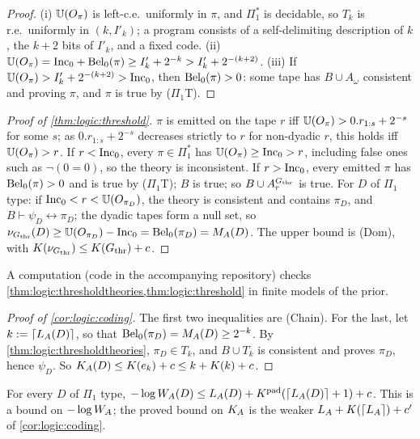 \begin{proof}
(i) $\mathbb{U}(O_\pi)$ is left-c.e.\ uniformly in $\pi$, and $\Pi_1^*$ is decidable, so $T_k$ is r.e.\ uniformly in $(k,I'_k)$; a program consists of a self-delimiting description of $k$, the $k+2$ bits of $I'_k$, and a fixed code. (ii) $\mathbb{U}(O_\pi)=\mathrm{Inc}_0+\mathrm{Bel}_0(\pi)\ge I'_k+2^{-k}>I'_k+2^{-(k+2)}$. (iii) If $\mathbb{U}(O_\pi)>I'_k+2^{-(k+2)}>\mathrm{Inc}_0$, then $\mathrm{Bel}_0(\pi)>0$: some tape has $B\cup A_\omega$ consistent and proving $\pi$, and $\pi$ is true by ($\Pi_1$T).
\end{proof}

\begin{proof}[Proof of \cref{thm:logic:threshold}]
$\pi$ is emitted on the tape $r$ iff $\mathbb{U}(O_\pi)>0.r_{1:s}+2^{-s}$ for some $s$; as $0.r_{1:s}+2^{-s}$ decreases strictly to $r$ for non-dyadic $r$, this holds iff $\mathbb{U}(O_\pi)>r$. If $r<\mathrm{Inc}_0$, every $\pi\in\Pi_1^*$ has $\mathbb{U}(O_\pi)\ge\mathrm{Inc}_0>r$, including false ones such as $\neg(0=0)$, so the theory is inconsistent. If $r>\mathrm{Inc}_0$, every emitted $\pi$ has $\mathrm{Bel}_0(\pi)>0$ and is true by ($\Pi_1$T); $B$ is true; so $B\cup A^{G_{\mathrm{thr}}}_r$ is true. For $D$ of $\Pi_1$ type: if $\mathrm{Inc}_0<r<\mathbb{U}(O_{\pi_D})$, the theory is consistent and contains $\pi_D$, and $B\vdash\psi_D\leftrightarrow\pi_D$; the dyadic tapes form a null set, so $\nu_{G_{\mathrm{thr}}}(D)\ge\mathbb{U}(O_{\pi_D})-\mathrm{Inc}_0=\mathrm{Bel}_0(\pi_D)=M_{A}(D)$. The upper bound is (Dom), with $K(\nu_{G_{\mathrm{thr}}})\le K(G_{\mathrm{thr}})+c$.
\end{proof}

A computation (code in the accompanying repository) checks \cref{thm:logic:thresholdtheories,thm:logic:threshold} in finite models of the prior.

\begin{proof}[Proof of \cref{cor:logic:coding}]
The first two inequalities are (Chain). For the last, let $k:=\lceil L_{A}(D)\rceil$, so that $\mathrm{Bel}_0(\pi_D)=M_{A}(D)\ge2^{-k}$. By \cref{thm:logic:thresholdtheories}, $\pi_D\in T_k$, and $B\cup T_k$ is consistent and proves $\pi_D$, hence $\psi_D$. So $K_{A}(D)\le K(e_k)+c\le k+K(k)+c$.
\end{proof}

\begin{remark}\label{rem:logic:Wbound}
For every $D$ of $\Pi_1$ type, $-\log W_{A}(D)\le L_{A}(D)+K^{\mathrm{pad}}(\lceil L_{A}(D)\rceil+1)+c$. This is a bound on $-\log W_{A}$; the proved bound on $K_{A}$ is the weaker $L_{A}+K(\lceil L_{A}\rceil)+c'$ of \cref{cor:logic:coding}.
\end{remark}

